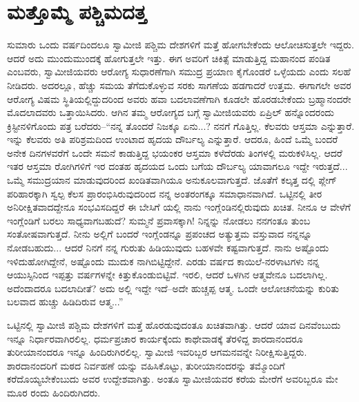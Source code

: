 
\chapter{ಮತ್ತೊಮ್ಮೆ ಪಶ್ಚಿಮದತ್ತ}

\noindent

ಸುಮಾರು ಒಂದು ವರ್ಷದಿಂದಲೂ ಸ್ವಾಮೀಜಿ ಪಶ್ಚಿಮ ದೇಶಗಳಿಗೆ ಮತ್ತೆ ಹೋಗಬೇಕೆಂದು ಆಲೋಚಿಸುತ್ತಲೇ ಇದ್ದರು. ಆದರೆ ಅದು ಮುಂದುಮುಂದಕ್ಕೆ ಹೋಗುತ್ತಲೇ ಇತ್ತು. ಈಗ ಅವರಿಗೆ ಚಿಕಿತ್ಸೆ ಮಾಡುತ್ತಿದ್ದ ಮಹಾನಂದ ಪಂಡಿತ ಎಂಬವರು, ಸ್ವಾಮೀಜಿಯವರು ಆರೋಗ್ಯ ಸುಧಾರಣೆಗಾಗಿ ಸಮುದ್ರ ಪ್ರಯಾಣ ಕೈಗೊಂಡರೆ ಒಳ್ಳೆಯದು ಎಂದು ಸಲಹೆ ನೀಡಿದರು. ಅದರಲ್ಲೂ, ಹೆಚ್ಚು ಸಮಯ ತೆಗೆದುಕೊಳ್ಳುವ ಸರಕು ಸಾಗಣೆಯ ಹಡಗಾದರೆ ಉತ್ತಮ. ಈಗಾಗಲೇ ಅವರ ಆರೋಗ್ಯ ವಿಷಮ ಸ್ಥಿತಿಯಲ್ಲಿದ್ದುದರಿಂದ ಅವರು ಹವಾ ಬದಲಾವಣೆಗಾಗಿ ಕೂಡಲೇ ಹೊರಡಬೇಕೆಂದು ಬ್ರಹ್ಮಾನಂದರೇ ಮೊದಲಾದವರು ಒತ್ತಾಯಿಸಿದರು. ಆಗಿನ ತಮ್ಮ ಆರೋಗ್ಯದ ಬಗ್ಗೆ ಸ್ವಾಮೀಜಿಯವರು ಏಪ್ರಿಲ್ ಹನ್ನೊಂದರಂದು ಕ್ರಿಸ್ಟೀನಳಿಗೊಂದು ಪತ್ರ ಬರೆದರು–“ನನ್ನ ತೊಂದರೆ ನಿಜಕ್ಕೂ ಏನು...? ನನಗೆ ಗೊತ್ತಿಲ್ಲ. ಕೆಲವರು ಆಸ್ತಮಾ ಎನ್ನುತ್ತಾರೆ. ಇನ್ನು ಕೆಲವರು ಅತಿ ಪರಿಶ್ರಮದಿಂದ ಉಂಟಾದ ಹೃದಯ ದೌರ್ಬಲ್ಯ ಎನ್ನುತ್ತಾರೆ. ಆದರೂ, ಹಿಂದೆ ಒಮ್ಮೆ ಬಂದರೆ ಅನೇಕ ದಿನಗಳವರೆಗೆ ಒಂದೇ ಸಮನೆ ಕಾಡುತ್ತಿದ್ದ ಭಯಂಕರ ಆಸ್ತಮಾ ಕಳೆದೆರಡು ತಿಂಗಳಲ್ಲಿ ಮರುಕಳಿಸಿಲ್ಲ. ಆದರೆ ಇತರ ಆಸ್ತಮಾ ರೋಗಿಗಳಿಗೆ ಇರ ದಂತಹ ಹೃದಯದ ಒಂದು ಬಗೆಯ ದೌರ್ಬಲ್ಯ ಯಾವಾಗಲೂ ಇದ್ದೇ ಇರುತ್ತದೆ... ಒಮ್ಮೆ ಸಮುದ್ರಯಾನ ಮಾಡುವುದರಿಂದ ಖಂಡಿತವಾಗಿಯೂ ಅನುಕೂಲವಾಗುತ್ತದೆ. ಜೊತೆಗೆ ಕಲ್ಕತ್ತ ದಲ್ಲಿ ಪ್ಲೇಗ್ ಪರಿಹಾರಕ್ಕಾಗಿ ಸ್ವಲ್ಪ ಕೆಲಸ ಪ್ರಾರಂಭಿಸಿರುವುದರಿಂದ ನನ್ನ ಅಂತರಂಗಕ್ಕೂ ಸಮಾಧಾನವಾಗಿದೆ. ಒಟ್ಟಿನಲ್ಲಿ ತೀರ ಅನಿರೀಕ್ಷಿತವಾದದ್ದೇನೂ ಸಂಭವಿಸದಿದ್ದರೆ ಈ ಬೇಸಿಗೆ ಯಲ್ಲಿ ನಾನು ಇಂಗ್ಲೆಂಡಿನಲ್ಲಿರುವುದು ಖಚಿತ. ನೀನೂ ಆ ವೇಳೆಗೆ ಇಂಗ್ಲೆಂಡಿಗೆ ಬರಲು ಸಾಧ್ಯವಾಗಬಹುದೆ? ಸುಮ್ಮನೆ ಪ್ರವಾಸಕ್ಕಾಗಿ! ನಿನ್ನನ್ನು ನೋಡಲು ನನಗಂತೂ ತುಂಬ ಸಂತೋಷವಾಗುತ್ತದೆ. ನೀನು ಅಲ್ಲಿಗೆ ಬಂದರೆ ಇಂಗ್ಲೆಂಡನ್ನೂ ಪ್ರಪಂಚದ ಅತ್ಯುತ್ತಮ ವಸ್ತುವಾದ ನನ್ನನ್ನೂ ನೋಡಬಹುದು... ಆದರೆ ನಿನಗೆ ನನ್ನ ಗುರುತು ಹಿಡಿಯುವುದು ಬಹಳವೇ ಕಷ್ಟವಾಗುತ್ತದೆ. ನಾನು ಅಷ್ಟೊಂದು ಇಳಿದುಹೋಗಿದ್ದೇನೆ, ಅಷ್ಟೊಂದು ಮುದುಕ ನಾಗಿಬಿಟ್ಟಿದ್ದೇನೆ. ಎರಡು ವರ್ಷದ ಕಾಯಿಲೆ-ನರಳಾಟಗಳು ನನ್ನ ಆಯುಸ್ಸಿನಿಂದ ಇಪ್ಪತ್ತು ವರ್ಷಗಳನ್ನೇ ಕಿತ್ತುಕೊಂಡುಬಿಟ್ಟಿವೆ. ಇರಲಿ, ಆದರೆ ಒಳಗಿನ ಆತ್ಮವೇನೂ ಬದಲಾಗಿಲ್ಲ. ಅದೆಂದಾದರೂ ಬದಲಾದೀತೆ? ಅದು ಅಲ್ಲಿ ಇದ್ದೇ ಇದೆ–ಅದೇ ಹುಚ್ಚಪ್ಪ ಆತ್ಮ. ಒಂದೇ ಆಲೋಚನೆಯನ್ನು ಕುರಿತು ಬಲವಾದ ಹುಚ್ಚು ಹಿಡಿದಿರುವ ಆತ್ಮ...”

ಒಟ್ಟಿನಲ್ಲಿ ಸ್ವಾಮೀಜಿ ಪಶ್ಚಿಮ ದೇಶಗಳಿಗೆ ಮತ್ತೆ ಹೊರಡುವುದಂತೂ ಖಚಿತವಾಗಿತ್ತು. ಆದರೆ ಯಾವ ದಿನವೆಂಬುದು ಇನ್ನೂ ನಿರ್ಧಾರವಾಗಿರಲಿಲ್ಲ. ಧರ್ಮಪ್ರಚಾರ ಕಾರ್ಯಕ್ಕೆಂದು ಕಾಥೇವಾಡಕ್ಕೆ ತೆರಳಿದ್ದ ಶಾರದಾನಂದರೂ ತುರೀಯಾನಂದರೂ ಇನ್ನೂ ಹಿಂದಿರುಗಿರಲಿಲ್ಲ. ಸ್ವಾಮೀಜಿ ಇವರಿಬ್ಬರ ಆಗಮನವನ್ನೇ ನಿರೀಕ್ಷಿಸುತ್ತಿದ್ದರು. ಶಾರದಾನಂದರಿಗೆ ಮಠದ ನಿರ್ವಹಣೆ ಯನ್ನು ವಹಿಸಿಕೊಟ್ಟು, ತುರೀಯಾನಂದರನ್ನು ತಮ್ಮೊಂದಿಗೆ ಕರೆದೊಯ್ಯಬೇಕೆಂಬುದು ಅವರ ಉದ್ದೇಶವಾಗಿತ್ತು. ಅಂತೂ ಸ್ವಾಮೀಜಿಯವರ ಕರೆಯ ಮೇರೆಗೆ ಅವರಿಬ್ಬರೂ ಮೇ ಮೂರ ರಂದು ಹಿಂದಿರುಗಿದರು.

